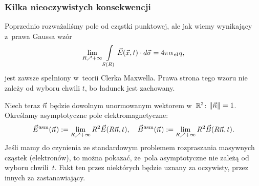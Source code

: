 \documentclass[10pt,t]{beamer}
\begin{document}
\begin{frame}
  \frametitle{Kilka nieoczywistych konsekwencji}


  Poprzednio rozważaliśmy pole od cząstki punktowej, ale jak wiemy
  wynikający z~prawa Gaussa wzór
  \begin{equation}
    \label{eq:Glowne-rodzaje-problemow-podczerwonych-08}
    \lim_{ R \nearrow +\infty } \int\limits_{ S( R ) } \vec{E}( \vec{x}, t ) \cdot d\vec{ \sigma } =
    4 \pi \alpha_{ \hspace{0.09em} \text{el} } \hspace{0.09em} q,
  \end{equation}
  jest zawsze spełniony w~teorii Clerka Maxwella. Prawa strona
  tego wzoru nie zależy od wyboru chwili $t$, bo ładunek jest zachowany.

  Niech teraz $\vec{n}$
  będzie dowolnym unormowanym wektorem w~$\mathbb{R}^{ 3 }$: $\Vert \vec{n} \Vert = 1$.
  Określamy asymptotyczne pole elektromagnetyczne:
  \begin{equation}
    \label{eq:Glowne-rodzaje-problemow-podczerwonych-09}
    \vec{E}^{ \hspace{0.05em} \text{asm} }( \vec{n} \hspace{0.05em} ) :=
    \lim_{ R \nearrow +\infty } R^{ 2 } \vec{E}( R \vec{n}, t ), \quad
    \vec{B}^{ \hspace{0.05em} \text{asm} }( \vec{n} \hspace{0.05em} ) :=
    \lim_{ R \nearrow +\infty } R^{ 2 } \vec{B}( R \vec{n}, t ).
  \end{equation}
  Jeśli mamy do czynienia ze standardowym problemem rozpraszania masywnych
  cząstek (elektronów), to można pokazać, że~pola asymptotyczne nie zależą
  od wyboru chwili~$t$. Fakt ten przez niektórych będzie uznany za
  oczywisty, przez innych za zastanawiający.

\end{frame}
\end{document}
